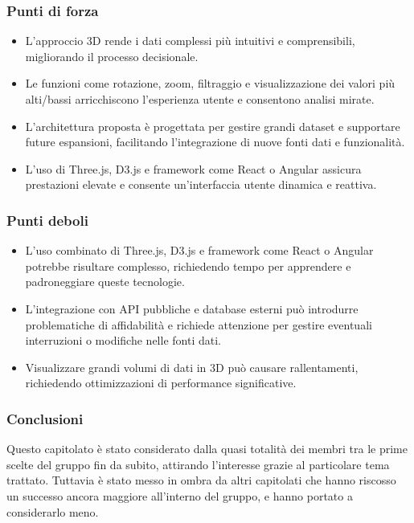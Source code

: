     \subsubsection{Punti di forza}
        \begin{itemize}
            \item L’approccio 3D rende i dati complessi più intuitivi e comprensibili, migliorando il processo decisionale.
            \item Le funzioni come rotazione, zoom, filtraggio e visualizzazione dei valori più alti/bassi arricchiscono l’esperienza utente e consentono analisi mirate.
            \item L’architettura proposta è progettata per gestire grandi dataset e supportare future espansioni, facilitando l’integrazione di nuove fonti dati e funzionalità.
            \item L’uso di Three.js, D3.js e framework come React o Angular assicura prestazioni elevate e consente un’interfaccia utente dinamica e reattiva.
        \end{itemize}
    \subsubsection{Punti deboli}
        \begin{itemize}
            \item L’uso combinato di Three.js, D3.js e framework come React o Angular potrebbe risultare complesso, richiedendo tempo per apprendere e padroneggiare queste tecnologie.
            \item L’integrazione con API pubbliche e database esterni può introdurre problematiche di affidabilità e richiede attenzione per gestire eventuali interruzioni o modifiche nelle fonti dati.
            \item Visualizzare grandi volumi di dati in 3D può causare rallentamenti, richiedendo ottimizzazioni di performance significative.
        \end{itemize}
    \subsubsection{Conclusioni}
        Questo capitolato è stato considerato dalla quasi totalità dei membri tra le prime scelte del gruppo fin da subito, attirando l’interesse grazie al particolare tema trattato. Tuttavia è stato messo in ombra da altri capitolati che hanno riscosso un successo ancora maggiore all’interno del gruppo, e hanno portato a considerarlo meno.




